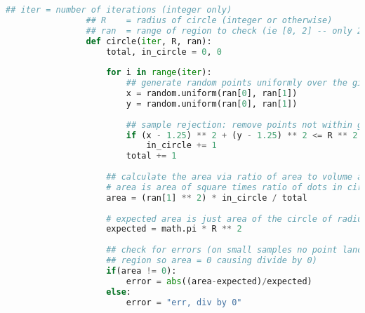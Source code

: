 \documentclass[11pt]{article}
\begin{document}
\begin{enumerate}
\begin{lstlisting}[style=mystyle, linewidth=0.94\linewidth, 
                                language=Python, gobble=12, caption=Monte Carlo
                                Rejection Sampling for Area of Circle]
                ## iter = number of iterations (integer only)
                ## R    = radius of circle (integer or otherwise)
                ## ran  = range of region to check (ie [0, 2] -- only 2D range accepted)
                def circle(iter, R, ran):
                    total, in_circle = 0, 0
                
                    for i in range(iter):
                        ## generate random points uniformly over the given interval 'ran'
                        x = random.uniform(ran[0], ran[1])
                        y = random.uniform(ran[0], ran[1])
                
                        ## sample rejection: remove points not within given area
                        if (x - 1.25) ** 2 + (y - 1.25) ** 2 <= R ** 2:
                            in_circle += 1
                        total += 1
                
                    ## calculate the area via ratio of area to volume and expected area
                    # area is area of square times ratio of dots in circle vs out
                    area = (ran[1] ** 2) * in_circle / total
                
                    # expected area is just area of the circle of radius R
                    expected = math.pi * R ** 2
                
                    ## check for errors (on small samples no point lands in 
                    ## region so area = 0 causing divide by 0)
                    if(area != 0):
                        error = abs((area-expected)/expected)
                    else: 
                        error = "err, div by 0"
                

\end{lstlisting}
\end{enumerate}
\end{document}
